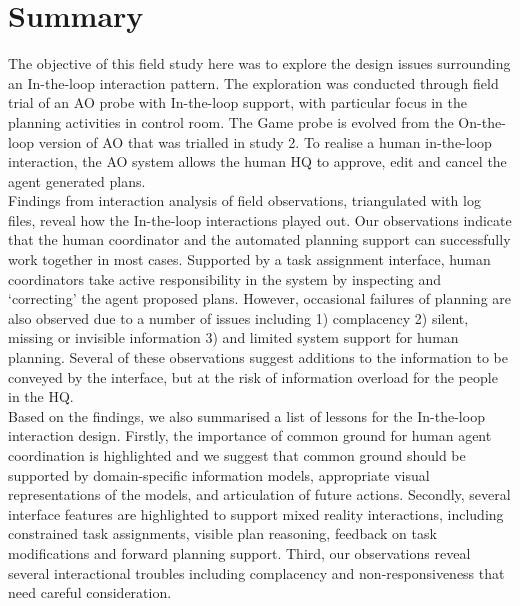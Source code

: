 \section{Summary}
The objective of this field study here was to explore the design issues surrounding an In-the-loop interaction pattern. The exploration was conducted through field trial of an \acf{AO} probe with In-the-loop support, with particular focus in the planning activities in control room. The Game probe is evolved from the On-the-loop version of \ac{AO} that was trialled in study 2. To realise a human in-the-loop interaction, the \ac{AO} system allows the human HQ to approve, edit and cancel the agent generated plans. \\

Findings from interaction analysis of field observations, triangulated with log files, reveal how the In-the-loop interactions played out. Our observations indicate that the human coordinator and the automated planning support can successfully work together in most cases. Supported by a task assignment interface, human coordinators take active responsibility in the system by inspecting and `correcting' the agent proposed plans. However, occasional failures of planning are also observed due to a number of issues including 1) complacency 2) silent, missing or invisible information 3) and limited system support for human planning. Several of these observations suggest additions to the information to be conveyed by the interface, but at the risk of information overload for the people in the HQ.\\

Based on the findings, we also summarised a list of lessons for the In-the-loop interaction design. Firstly, the importance of common ground for human agent coordination is highlighted and we suggest that common ground should be supported by domain-specific information models, appropriate visual representations of the models, and articulation of future actions. Secondly, several interface features are highlighted to support mixed reality interactions, including 
constrained task assignments, visible plan reasoning, feedback on task modifications and forward planning support. Third, our observations reveal several interactional troubles including complacency and non-responsiveness that need careful consideration.\\


